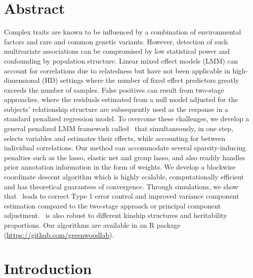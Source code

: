\newpage

\section*{Abstract}
	Complex traits are known to be influenced by a combination of environmental factors and rare and common genetic variants. However, detection of such multivariate associations can be compromised by low statistical power and confounding by population structure. Linear mixed effect models (LMM) can account for correlations due to relatedness but have not been applicable in high-dimensional (HD) settings where the number of fixed effect predictors greatly exceeds the number of samples. False positives can result from two-stage approaches, where the residuals estimated from a null model adjusted for the subjects' relationship structure are subsequently used as the response in a standard penalized regression model. To overcome these challenges, we develop a general penalized LMM framework called \ggmix ~that simultaneously, in one step, selects variables and estimates their effects, while accounting for between individual correlations. Our method can accommodate several sparsity-inducing penalties such as the lasso, elastic net and group lasso, and also readily handles prior annotation information in the form of weights. We develop a blockwise coordinate descent algorithm which is highly scalable, computationally efficient and has theoretical guarantees of convergence. Through simulations, we show that \ggmix ~leads to correct Type 1 error control and improved variance component estimation compared to the two-stage approach or principal component adjustment. \ggmix ~is also robust to different kinship structures and heritability proportions. %
	Our algorithms are available in an R package (\url{https://github.com/greenwoodlab}).

\newpage

\section{Introduction}

